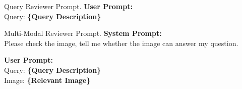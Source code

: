 \begin{figure*}[!ht]
\begin{AIbox}{Query Reviewer Prompt.}
\tcblower
{\color{black}\bf \large User Prompt:}\\
Query: {\color{deepblue}\bf \{Query Description\}} 
\end{AIbox}
\vspace{-1em}
\caption{Prompt of Query Reviewer.}
\label{fig: reviewer}
\end{figure*}


\begin{figure*}[!ht] 
\begin{AIbox}{Multi-Modal Reviewer Prompt.}
{\color{black}\bf \large System Prompt:} 
\vspace{1mm}
\\
Please check the image, tell me whether the image can answer my question.

\tcblower
{\color{black}\bf \large User Prompt:}\\
Query: {\color{deepblue}\bf \{Query Description\}}\\
Image: {\color{deepblue}\bf \{Relevant Image\}} 
\end{AIbox}
\vspace{-1em}
\caption{Prompt of Multi-Modal Reviewer.}
\label{fig: multi_reviewer}
\end{figure*}
